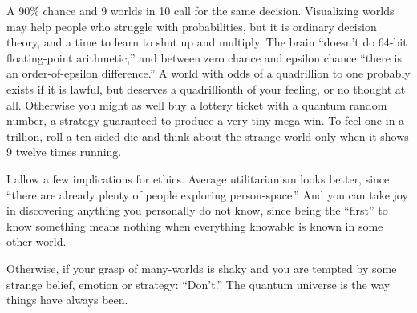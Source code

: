 A 90\% chance and 9 worlds in 10 call for the same decision.  Visualizing worlds may help people who struggle with probabilities, but it is ordinary decision theory, and a time to learn to shut up and multiply. The brain ``doesn't do 64-bit floating-point arithmetic,'' and between zero chance and epsilon chance ``there is an order-of-epsilon difference.'' A world with odds of a quadrillion to one probably exists if it is lawful, but deserves a quadrillionth of your feeling, or no thought at all. Otherwise you might as well buy a lottery ticket with a quantum random number, a strategy guaranteed to produce a very tiny mega-win. To feel one in a trillion, roll a ten-sided die and think about the strange world only when it shows 9 twelve times running.

I allow a few implications for ethics. Average utilitarianism looks better, since ``there are already plenty of people exploring person-space.''  And you can take joy in discovering anything you personally do not know, since being the ``first'' to know something means nothing when everything knowable is known in some other world. 

Otherwise, if your grasp of many-worlds is shaky and you are tempted by some strange belief, emotion or strategy: ``Don't.'' The quantum universe is the way things have always been.
